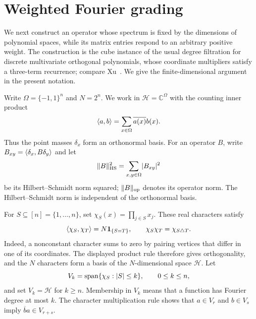 \section{Weighted Fourier grading}\label{sec:grading}

We next construct an operator whose spectrum is fixed by the dimensions
of polynomial spaces, while its matrix entries respond to an arbitrary
positive weight. The construction is the cube instance of the usual degree
filtration for discrete multivariate orthogonal polynomials, whose
coordinate multipliers satisfy a three-term recurrence; compare
Xu~\cite[Section~3]{Xu2004}. We give the finite-dimensional argument in
the present notation.


Write $\Omega=\{-1,1\}^n$ and $N=2^n$. We work in
$\mathcal H=\mathbb C^\Omega$ with the counting inner product
\[
 \langle a,b\rangle=\sum_{x\in\Omega}\overline{a(x)}b(x).
\]
Thus the point masses $\delta_x$ form an orthonormal basis. For an operator
$B$, write $B_{xy}=\langle \delta_x,B\delta_y\rangle$ and let
\[
 \lVert B\rVert_{\mathrm{HS}}^2=\sum_{x,y\in\Omega}\lvert B_{xy}\rvert^2
\]
be its Hilbert--Schmidt norm squared; $\lVert B\rVert_{\mathrm{op}}$ denotes its operator
norm. The Hilbert--Schmidt norm is independent of the orthonormal basis.

For $S\subseteq[n]=\{1,\ldots,n\}$, set
$\chi_S(x)=\prod_{j\in S}x_j$. These real characters satisfy
\[
 \langle \chi_S,\chi_T\rangle=N\mathbf1_{\{S=T\}},\qquad
 \chi_S\chi_T=\chi_{S\mathbin\triangle T}.
\]
Indeed, a nonconstant character sums to zero by pairing vertices that
differ in one of its coordinates. The displayed product rule therefore
gives orthogonality, and the $N$ characters form a basis of the
$N$-dimensional space $\mathcal H$. Let
\[
 V_k=\operatorname{span}\{\chi_S:\lvert S\rvert\le k\},\qquad 0\le k\le n,
\]
and set $V_k=\mathcal H$ for $k\ge n$. Membership in $V_k$ means that a
function has Fourier degree at most $k$. The character multiplication rule
shows that $a\in V_r$ and $b\in V_s$ imply $\overline b a\in V_{r+s}$.

